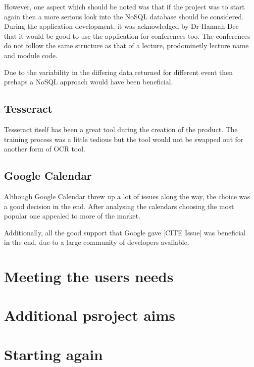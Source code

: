 However, one aspect which should be noted was that if the project was to start again then a more serious look into the NoSQL database should be considered. During the application development, it was acknowledged by Dr Hannah Dee that it would be good to use the application for conferences too. The conferences do not follow the same structure as that of a lecture, prodominetly lecture name and module code.

Due to the variability in the differing data returned for different event then prehaps a NoSQL approach would have been beneficial.

\subsection{Tesseract}
Tesseract itself has been a great tool during the creation of the product. The training process was a little tedious but the tool would not be swapped out for another form of OCR tool.

\subsection{Google Calendar}
Although Google Calendar threw up a lot of issues along the way, the choice was a good decision in the end. After analysing the calendars choosing the most popular one appealed to more of the market.

Additionally, all the good support that Google gave [CITE Issue] was beneficial in the end, due to a large community of developers available.
\section{Meeting the users needs}

\section{Additional psroject aims}

\section{Starting again}
